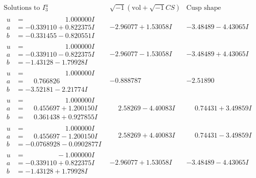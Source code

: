 \documentclass[1p]{elsarticle_modified}
\theoremstyle{definition}
\newcommand{\I}{\sqrt{-1}}
\begin{document}
$$\begin{array}{c|c|c}  
\text{Solutions to }I^u_{3}& \I (\text{vol} + \sqrt{-1}CS) & \text{Cusp shape}\\
 \hline 
\begin{aligned}
u &= \phantom{-0.000000 -}1.000000 I \\
a &= -0.339110 + 0.822375 I \\
b &= -0.331455 - 0.820551 I\end{aligned}
 & -2.96077 + 1.53058 I & -3.48489 - 4.43065 I \\ \hline\begin{aligned}
u &= \phantom{-0.000000 -}1.000000 I \\
a &= -0.339110 - 0.822375 I \\
b &= -1.43128 - 1.79928 I\end{aligned}
 & -2.96077 - 1.53058 I & -3.48489 + 4.43065 I \\ \hline\begin{aligned}
u &= \phantom{-0.000000 -}1.000000 I \\
a &= \phantom{-}0.766826\phantom{ +0.000000I} \\
b &= -3.52181 - 2.21774 I\end{aligned}
 & -0.888787\phantom{ +0.000000I} & -2.51890\phantom{ +0.000000I} \\ \hline\begin{aligned}
u &= \phantom{-0.000000 -}1.000000 I \\
a &= \phantom{-}0.455697 + 1.200150 I \\
b &= \phantom{-}0.361438 + 0.927855 I\end{aligned}
 & \phantom{-}2.58269 - 4.40083 I & \phantom{-}0.74431 + 3.49859 I \\ \hline\begin{aligned}
u &= \phantom{-0.000000 -}1.000000 I \\
a &= \phantom{-}0.455697 - 1.200150 I \\
b &= -0.0768928 - 0.0902877 I\end{aligned}
 & \phantom{-}2.58269 + 4.40083 I & \phantom{-}0.74431 - 3.49859 I \\ \hline\begin{aligned}
u &= \phantom{-0.000000 } -1.000000 I \\
a &= -0.339110 + 0.822375 I \\
b &= -1.43128 + 1.79928 I\end{aligned}
 & -2.96077 + 1.53058 I & -3.48489 - 4.43065 I \\ \hline\begin{aligned}

\end{aligned}
\end{array}$$
\end{document}
